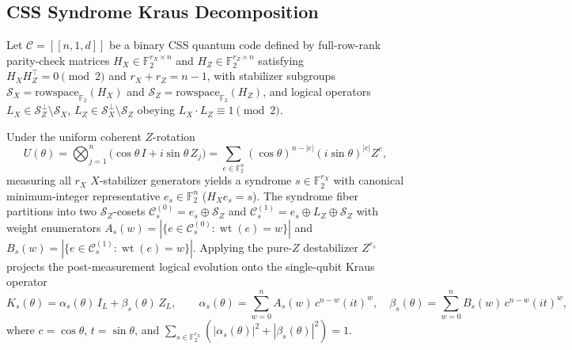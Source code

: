 \documentclass[11pt,a4paper]{article}
\theoremstyle{plain}
\theoremstyle{definition}
\newcommand{\Ftwo}{\mathbb{F}_2}
\newcommand{\SZ}{\mathcal{S}_Z}
\newcommand{\SX}{\mathcal{S}_X}
\newcommand{\wt}{\operatorname{wt}}
\begin{document}
\subsection{CSS Syndrome Kraus Decomposition}

Let $\mathcal{C} = [[n, 1, d]]$ be a binary CSS quantum code defined by full-row-rank parity-check matrices $H_X \in \Ftwo^{r_X \times n}$ and $H_Z \in \Ftwo^{r_Z \times n}$ satisfying $H_X H_Z^\top = 0 \pmod 2$ and $r_X + r_Z = n - 1$, with stabilizer subgroups $\SX = \mathrm{rowspace}_{\Ftwo}(H_X)$ and $\SZ = \mathrm{rowspace}_{\Ftwo}(H_Z)$, and logical operators $L_X \in \SZ^\perp \setminus \SX$, $L_Z \in \SX^\perp \setminus \SZ$ obeying $L_X \cdot L_Z \equiv 1 \pmod 2$.

Under the uniform coherent $Z$-rotation
\begin{equation}
  U(\theta) = \bigotimes_{j=1}^{n}\big(\cos\theta\,I + i\sin\theta\,Z_j\big)
  = \sum_{e \in \Ftwo^n} (\cos\theta)^{n-|e|}(i\sin\theta)^{|e|} Z^e,
\end{equation}
measuring all $r_X$ $X$-stabilizer generators yields a syndrome $s \in \Ftwo^{r_X}$ with canonical minimum-integer representative $e_s \in \Ftwo^n$ ($H_X e_s = s$). The syndrome fiber partitions into two $\SZ$-cosets $\mathcal{C}_s^{(0)} = e_s \oplus \SZ$ and $\mathcal{C}_s^{(1)} = e_s \oplus L_Z \oplus \SZ$ with weight enumerators $A_s(w) = |\{e \in \mathcal{C}_s^{(0)} : \wt(e) = w\}|$ and $B_s(w) = |\{e \in \mathcal{C}_s^{(1)} : \wt(e) = w\}|$. Applying the pure-$Z$ destabilizer $Z^{e_s}$ projects the post-measurement logical evolution onto the single-qubit Kraus operator
\begin{equation}
  K_s(\theta) = \alpha_s(\theta)\, I_L + \beta_s(\theta)\, Z_L,
  \qquad
  \alpha_s(\theta) = \sum_{w=0}^{n} A_s(w)\, c^{n-w} (it)^w,
  \quad
  \beta_s(\theta) = \sum_{w=0}^{n} B_s(w)\, c^{n-w} (it)^w,
  \label{eq:kraus}
\end{equation}
where $c = \cos\theta$, $t = \sin\theta$, and $\sum_{s \in \Ftwo^{r_X}} (|\alpha_s(\theta)|^2 + |\beta_s(\theta)|^2) = 1$.
\end{document}
